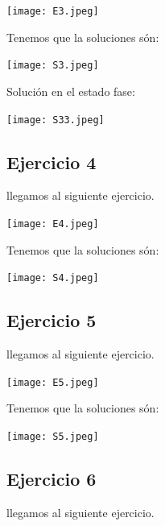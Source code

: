 \documentclass[12pt]{article}
\begin{document}
\begin{center}
    \texttt{[image: E3.jpeg]}
\end{center}

Tenemos que la soluciones són:

\begin{center}
    \texttt{[image: S3.jpeg]}
\end{center}

Solución en el estado fase:

\begin{center}
    \texttt{[image: S33.jpeg]}
\end{center}




\subsection*{Ejercicio 4}
llegamos al siguiente ejercicio.

\begin{center}
    \texttt{[image: E4.jpeg]}
\end{center}

Tenemos que la soluciones són:

\begin{center}
    \texttt{[image: S4.jpeg]}
\end{center}




\subsection*{Ejercicio 5}
llegamos al siguiente ejercicio.

\begin{center}
    \texttt{[image: E5.jpeg]}
\end{center}

Tenemos que la soluciones són:

\begin{center}
    \texttt{[image: S5.jpeg]}
\end{center}




\subsection*{Ejercicio 6}
llegamos al siguiente ejercicio.
\end{document}
